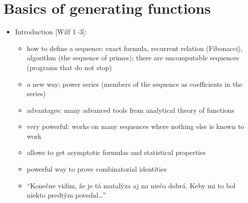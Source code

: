 \documentclass[10pt, a4paper]{article}
\begin{document}

\addtolength{\parskip}{0.5\baselineskip}



\section{Basics of generating functions}
\begin{itemize}
\item 
Introduction [Wilf 1--3]:
\begin{itemize}
    \item how to define a sequence: exact formula, recurrent relation (Fibonacci), algorithm (the sequence of primes); there are uncomputable sequences (programs that do not stop)
    \item a new way: power series (members of the sequence as coefficients in the series)
    \item advantages: many advanced tools from analytical theory of functions
    \item very powerful: works on many sequences where nothing else is known to work
    \item allows to get asymptotic formulas and statistical properties
    \item powerful way to prove combinatorial identities
    \item ``Konečne vidím, že je tá matalýza aj na niečo dobrá. Keby mi to bol niekto predtým povedal\dots''
\end{itemize}


\end{itemize}
\end{document}
